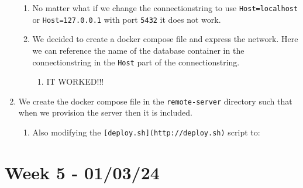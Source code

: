 \begin{enumerate}
    \begin{enumerate}
    \item No matter what if we change the connectionstring to use \texttt{Host=localhost} or \texttt{Host=127.0.0.1} with port \texttt{5432} it does not work.
    \item We decided to create a docker compose file and express the network. Here we can reference the name of the database container in the connectionstring in the \texttt{Host} part of the connectionstring.

        \begin{enumerate}
            \item IT WORKED!!! 🥳💥✨🎉
        \end{enumerate}
    \end{enumerate}
    \item We create the docker compose file in the \texttt{remote-server} directory such that when we provision the server then it is included.

    \begin{enumerate}
        \item Also modifying the \texttt{{[}deploy.sh{]}(http://deploy.sh)} script to:


    \end{enumerate}
\end{enumerate}

\section{Week 5 - 01/03/24}
\label{log:week5}

